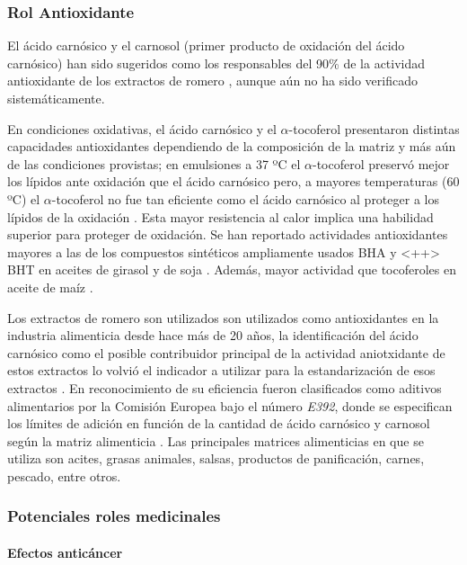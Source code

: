 \documentclass[11pt,a4paper]{article}
\begin{document}
\subsubsection{Rol Antioxidante}

El ácido carnósico y el carnosol (primer producto de oxidación del ácido carnósico) han sido sugeridos como los responsables del 90\% de la actividad antioxidante de los extractos de romero \cite{auroma_1992}, aunque aún no ha sido verificado sistemáticamente.

En condiciones oxidativas, el ácido carnósico y el $\alpha$-tocoferol presentaron distintas capacidades antioxidantes dependiendo de la composición de la matriz y más aún de las condiciones provistas; en emulsiones a 37 ºC el $\alpha$-tocoferol preservó mejor los lípidos ante oxidación que el ácido carnósico pero, a mayores temperaturas (60 ºC) el $\alpha$-tocoferol no fue tan eficiente como el ácido carnósico al proteger a los lípidos de la oxidación \cite{huang_1996}.
Esta mayor resistencia al calor implica una habilidad superior para proteger de oxidación.
Se han reportado actividades antioxidantes mayores a las de los compuestos sintéticos ampliamente usados \ac{BHA} y <++> \ac{BHT} en aceites de girasol y de soja \cite{cuvelier_1994} \cite{erkan_2008} \cite{richeimer_1996}.
Además, mayor actividad que tocoferoles en aceite de maíz \cite{cuvelier_1994}.

Los extractos de romero son utilizados son utilizados como antioxidantes en la industria alimenticia desde hace más de 20 años, la identificación del ácido carnósico como el posible contribuidor principal de la actividad aniotxidante de estos extractos lo volvió el indicador a utilizar para la estandarización de esos extractos \cite{carnosic_review}.
En reconocimiento de su eficiencia fueron clasificados como aditivos alimentarios por la Comisión Europea bajo el número \emph{E392}, donde se especifican los límites de adición en función de la cantidad de ácido carnósico y carnosol según la matriz alimenticia \cite{efsa_2008}.
Las principales matrices alimenticias en que se utiliza son acites, grasas animales, salsas, productos de panificación, carnes, pescado, entre otros.


\subsubsection{Potenciales roles medicinales}

\paragraph{Efectos anticáncer} 
\end{document}
